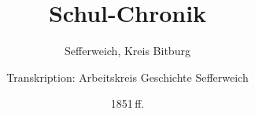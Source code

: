 



\frontmatter
\title{Schul-Chronik}
\subtitle{Sefferweich, Kreis Bitburg}
\author{Transkription: Arbeitskreis Geschichte Sefferweich}
\date{1851\,ff.}
\maketitle

\mainmatter
\beginnumbering

\pstart


\originalpagebreak

\pstart


\originalpagebreak

\pstart

\pend

\originalpagebreak



\originalpagebreak

\pstart


\originalpagebreak

\pstart


\originalpagebreak

\pstart


\originalpagebreak

\pstart


\originalpagebreak

\pstart


\originalpagebreak

\pstart


\originalpagebreak

\pstart


\originalpagebreak

\pstart


\originalpagebreak

\pstart


\originalpagebreak

\pstart


\originalpagebreak

\pstart


\originalpagebreak



